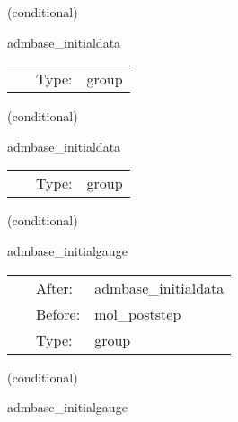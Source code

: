 \documentclass{article}
\begin{document}
   (conditional) 

\hspace{5mm} admbase\_initialdata 

\hspace{5mm}{\it schedule group for calculating adm initial data } 


\hspace{5mm}

 \begin{tabular*}{160mm}{cll} 
~ & Type:  & group \\ 
\end{tabular*} 


\vspace{5mm}

   (conditional) 

\hspace{5mm} admbase\_initialdata 

\hspace{5mm}{\it schedule group for calculating adm initial data } 


\hspace{5mm}

 \begin{tabular*}{160mm}{cll} 
~ & Type:  & group \\ 
\end{tabular*} 


\vspace{5mm}

   (conditional) 

\hspace{5mm} admbase\_initialgauge 

\hspace{5mm}{\it schedule group for the adm initial gauge condition } 


\hspace{5mm}

 \begin{tabular*}{160mm}{cll} 
~ & After:  & admbase\_initialdata \\ 
~ & Before:  & mol\_poststep \\ 
~ & Type:  & group \\ 
\end{tabular*} 


\vspace{5mm}

   (conditional) 

\hspace{5mm} admbase\_initialgauge 
\end{document}
